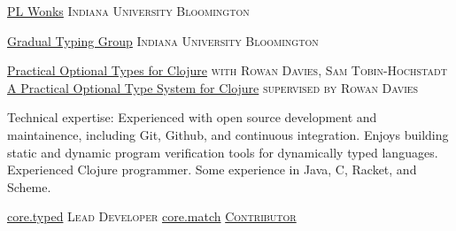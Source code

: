\documentclass[10pt,a4paper]{article}
\begin{document}

\headedsection
  {\href{http://wonks.github.io/}{PL Wonks}}
  {\textsc{Indiana University Bloomington}} {%
}

\headedsection
  {\href{http://prl.ccs.neu.edu/gtp/index.html}{Gradual Typing Group}}
  {\textsc{Indiana University Bloomington}} {%
}


\headedsection
  {\href{http://frenchy64.github.io/papers/esop16-short.pdf}{Practical Optional Types for Clojure}}
  {\textsc{with Rowan Davies, Sam Tobin-Hochstadt}} {%
    {}
}
\headedsection
  {\href{https://s3.amazonaws.com/github/downloads/frenchy64/papers/ambrose-honours.pdf}{A Practical Optional Type System for Clojure}}
  {\textsc{supervised by Rowan Davies}} {%
    {}
}

\spacedhrule{1.6em}{-0.4em}


\inlineheadsection  %
  {Technical expertise:}
  {Experienced with open source development and maintainence, 
    including Git, Github, and continuous integration.
    Enjoys building static and dynamic
    program verification tools for dynamically typed languages.
    Experienced Clojure programmer.
    Some experience in Java, C, Racket, and Scheme.
  }

%



\headedsection
  {\href{https://github.com/clojure/core.typed}{core.typed}}
  {\textsc{Lead Developer}} {%
    {
    }
}
\headedsection
  {\href{https://github.com/clojure/core.match}{core.match}}
  {\href{https://github.com/clojure/core.match/commits?author=frenchy64}{\textsc{Contributor}}} {%
    {
    }
}
\end{document}
